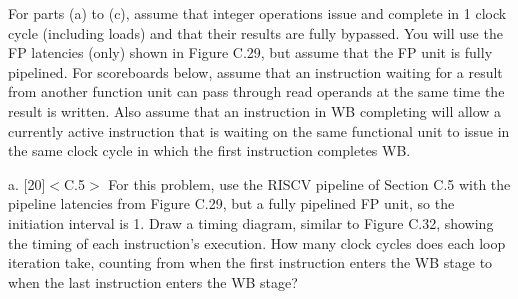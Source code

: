 \documentclass[11pt]{article}
\begin{document}
For parts (a) to (c), assume that integer operations issue and complete in 1 clock cycle (including loads) and that their results are fully bypassed. You will use the FP latencies (only) shown in Figure C.29, but assume that the FP unit is fully pipelined. For scoreboards below, assume that an instruction waiting for a result from another function unit can pass through read operands at the same time the result is written. Also assume that an instruction in WB completing will allow a currently active instruction that is waiting on the same functional unit to issue in the same clock cycle in which the first instruction completes WB.

a. [20]$<$C.5$>$ For this problem, use the RISCV pipeline of Section C.5 with the pipeline latencies from Figure C.29, but a fully pipelined FP unit, so the initiation interval is 1. Draw a timing diagram, similar to Figure C.32, showing the timing of each instruction's execution. How many clock cycles does each loop iteration take, counting from when the first instruction enters the WB stage to when the last instruction enters the WB stage?
 \newpage
\end{document}
